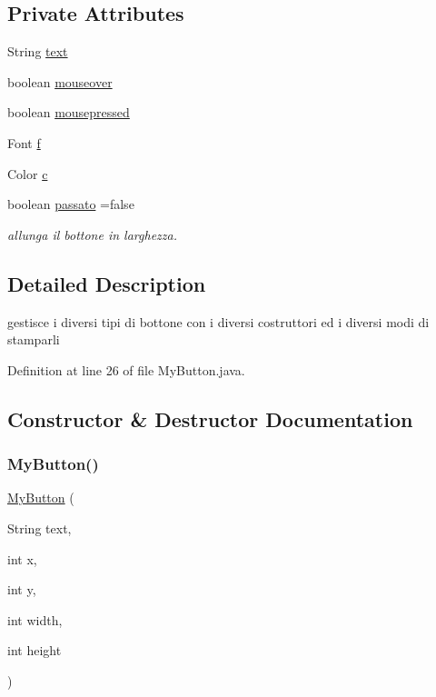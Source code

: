 \subsection*{Private Attributes}
\begin{DoxyCompactItemize}
\item 
String \hyperlink{classui_1_1_my_button_a685ed5195435d2b3e75433f46aec6e1e}{text}
\item 
boolean \hyperlink{classui_1_1_my_button_a6dcc94571aa727e4e184fa31e384a93a}{mouseover}
\item 
boolean \hyperlink{classui_1_1_my_button_a2843f5354ab4fdc301bfc00a460b202f}{mousepressed}
\item 
Font \hyperlink{classui_1_1_my_button_a3fb562f10e8f7f83cb2ed130eab6d439}{f}
\item 
Color \hyperlink{classui_1_1_my_button_a02094092ae89aa4b23bff1976bcbf90d}{c}
\item 
boolean \hyperlink{classui_1_1_my_button_a0934989a1c7ae6cc9f4e355977c198c3}{passato} =false
\begin{DoxyCompactList}\small\item\em allunga il bottone in larghezza. \end{DoxyCompactList}\end{DoxyCompactItemize}


\subsection{Detailed Description}
gestisce i diversi tipi di bottone con i diversi costruttori ed i diversi modi di stamparli 

Definition at line 26 of file My\+Button.\+java.



\subsection{Constructor \& Destructor Documentation}
\mbox{\label{classui_1_1_my_button_a1cad8afed447e8f9cd96d84acb16f139}} 
\subsubsection{\texorpdfstring{My\+Button()}{MyButton()}\hspace{0.1cm}{\footnotesize\ttfamily [1/4]}}
{\footnotesize\ttfamily \hyperlink{classui_1_1_my_button}{My\+Button} (\begin{DoxyParamCaption}\item[{String}]{text,  }\item[{int}]{x,  }\item[{int}]{y,  }\item[{int}]{width,  }\item[{int}]{height }\end{DoxyParamCaption})}



